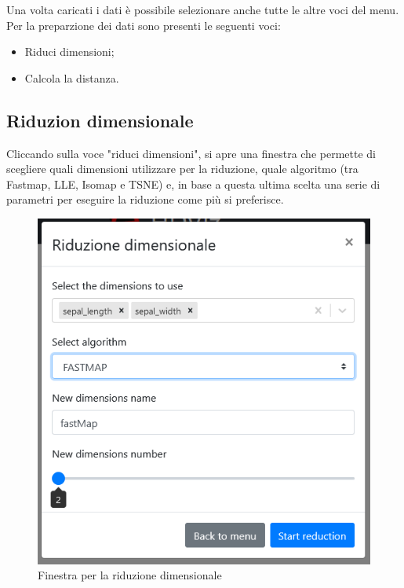 Una volta caricati i dati è possibile selezionare anche tutte le altre voci del menu. Per la preparzione dei dati sono presenti le seguenti voci:

\begin{itemize}
	\item Riduci dimensioni;
	
	\item Calcola la distanza.
\end{itemize}

\subsection{Riduzion dimensionale} 
Cliccando sulla voce "riduci dimensioni", si apre una finestra che permette di scegliere quali dimensioni utilizzare per la riduzione, quale algoritmo (tra Fastmap, LLE, Isomap e TSNE) e, in base a questa ultima scelta una serie di parametri per eseguire la riduzione come più si preferisce.
\begin{figure}[h]
		\includegraphics[scale=0.5]{Images/RiduzioneDimensionale.png}
		\centering
		\caption{Finestra per la riduzione dimensionale}
\end{figure}

